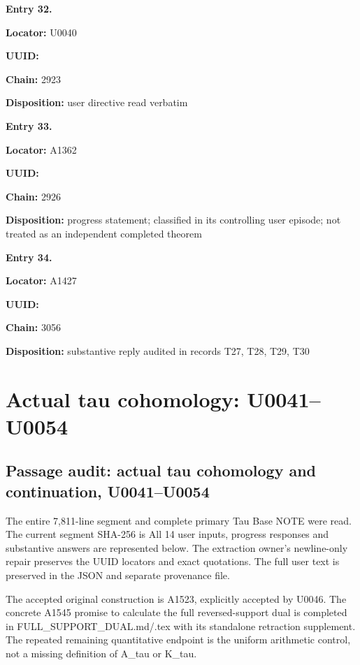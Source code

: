 \textbf{Entry 32.}

\textbf{Locator:} U0040

\textbf{UUID:} \protect{}

\textbf{Chain:} 2923

\textbf{Disposition:} user directive read verbatim


\textbf{Entry 33.}

\textbf{Locator:} A1362

\textbf{UUID:} \protect{}

\textbf{Chain:} 2926

\textbf{Disposition:} progress statement; classified in its controlling
user episode; not treated as an independent completed theorem


\textbf{Entry 34.}

\textbf{Locator:} A1427

\textbf{UUID:} \protect{}

\textbf{Chain:} 3056

\textbf{Disposition:} substantive reply audited in records T27, T28,
T29, T30

\clearpage

\section{Actual tau cohomology:
U0041--U0054}\label{actual-tau-cohomology-u0041u0054}

\subsection{Passage audit: actual tau cohomology and continuation,
U0041--U0054}\label{passage-audit-actual-tau-cohomology-and-continuation-u0041u0054}

The entire 7,811-line segment and complete primary Tau Base NOTE were
read. The current segment SHA-256 is
\protect{}
All 14 user inputs, progress responses and substantive answers are
represented below. The extraction owner's newline-only repair preserves
the UUID locators and exact quotations. The full user text is preserved
in the JSON and separate provenance file.

The accepted original construction is A1523, explicitly accepted by
U0046. The concrete A1545 promise to calculate the full reversed-support
dual is completed in FULL\_SUPPORT\_DUAL.md/.tex with its standalone
retraction supplement. The repeated remaining quantitative endpoint is
the uniform arithmetic control, not a missing definition of A\_tau or
K\_tau.

